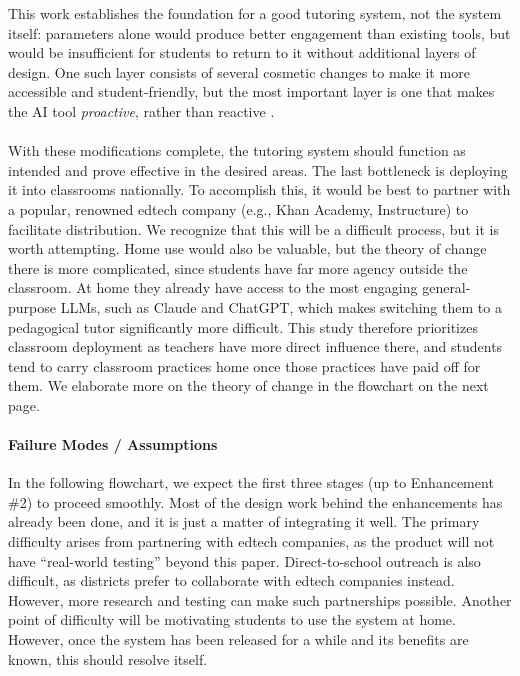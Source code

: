 \documentclass[12pt]{article}
\begin{document}
This work establishes the foundation for a good tutoring system, not the system itself: parameters alone would produce better engagement than existing tools, but would be insufficient for students to return to it without additional layers of design. One such layer consists of several cosmetic changes to make it more accessible and student-friendly, but the most important layer is one that makes the AI tool \emph{proactive}, rather than reactive \cite{wharton}.
\\\\
With these modifications complete, the tutoring system should function as intended and prove effective in the desired areas. The last bottleneck is deploying it into classrooms nationally. To accomplish this, it would be best to partner with a popular, renowned edtech company (e.g., Khan Academy, Instructure) to facilitate distribution. We recognize that this will be a difficult process, but it is worth attempting. Home use would also be valuable, but the theory of change there is more complicated, since students have far more agency outside the classroom. At home they already have access to the most engaging general-purpose LLMs, such as Claude and ChatGPT, which makes switching them to a pedagogical tutor significantly more difficult. This study therefore prioritizes classroom deployment as teachers have more direct influence there, and students tend to carry classroom practices home once those practices have paid off for them. We elaborate more on the theory of change in the flowchart on the next page.

\paragraph{Failure Modes / Assumptions}
In the following flowchart, we expect the first three stages (up to Enhancement \#2) to proceed smoothly. Most of the design work behind the enhancements has already been done, and it is just a matter of integrating it well. The primary difficulty arises from partnering with edtech companies, as the product will not have ``real-world testing'' beyond this paper. Direct-to-school outreach is also difficult, as districts prefer to collaborate with edtech companies instead. However, more research and testing can make such partnerships possible. Another point of difficulty will be motivating students to use the system at home. However, once the system has been released for a while and its benefits are known, this should resolve itself.
\end{document}
